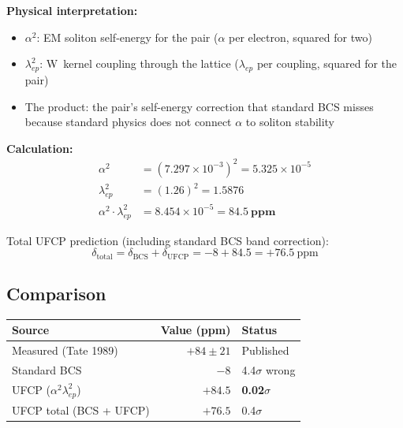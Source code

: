 \documentclass[11pt, a4paper]{article}
\begin{document}
\textbf{Physical interpretation:}
\begin{itemize}[nosep]
  \item $\alpha^2$: EM soliton self-energy for the pair
        ($\alpha$ per electron, squared for two)
  \item $\lambda_{ep}^2$: W~kernel coupling through the lattice
        ($\lambda_{ep}$ per coupling, squared for the pair)
  \item The product: the pair's self-energy correction that
        standard BCS misses because standard physics does not
        connect $\alpha$ to soliton stability
\end{itemize}

\textbf{Calculation:}
\begin{align}
  \alpha^2 &= (7.297 \times 10^{-3})^2 = 5.325 \times 10^{-5} \\
  \lambda_{ep}^2 &= (1.26)^2 = 1.5876 \\
  \alpha^2 \cdot \lambda_{ep}^2 &= 8.454 \times 10^{-5}
  = \mathbf{84.5~\text{ppm}}
\end{align}

Total UFCP prediction (including standard BCS band correction):
\begin{equation}
  \delta_{\text{total}} = \delta_{\text{BCS}} + \delta_{\text{UFCP}}
  = -8 + 84.5 = +76.5~\text{ppm}
\end{equation}

\subsection{Comparison}

\begin{center}
\begin{tabular}{@{}lrl@{}}
\toprule
\textbf{Source} & \textbf{Value (ppm)} & \textbf{Status} \\
\midrule
Measured (Tate 1989) & $+84 \pm 21$ & Published \\
Standard BCS & $-8$ & 4.4$\sigma$ wrong \\
UFCP ($\alpha^2\lambda_{ep}^2$) & $+84.5$ & \textbf{0.02$\sigma$} \\
UFCP total (BCS + UFCP) & $+76.5$ & 0.4$\sigma$ \\
\bottomrule
\end{tabular}
\end{center}

\begin{center}
\end{center}
\end{document}
